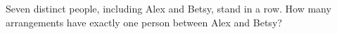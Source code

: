 Seven distinct people, including Alex and Betsy, stand in a row. How many arrangements have exactly one person between Alex and Betsy?
